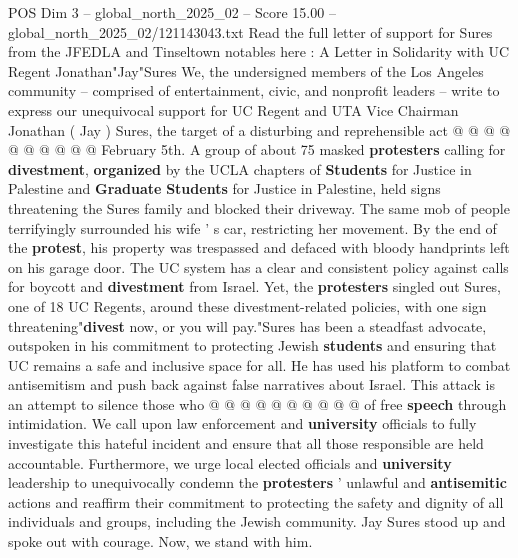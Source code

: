 \begin{textsample}{POS Dim 3 – global\_north\_2025\_02 – Score 15.00 – global\_north\_2025\_02/121143043.txt}
Read the full letter of support for Sures from the JFEDLA and Tinseltown notables here : A Letter in Solidarity with UC Regent Jonathan"Jay"Sures We, the undersigned members of the Los Angeles community -- comprised of entertainment, civic, and nonprofit leaders -- write to express our unequivocal support for UC Regent and UTA Vice Chairman Jonathan ( Jay ) Sures, the target of a disturbing and reprehensible act @ @ @ @ @ @ @ @ @ @ February 5th.
A group of about 75 masked \textbf{protesters} calling for \textbf{divestment}, \textbf{organized} by the UCLA chapters of \textbf{Students} for Justice in Palestine and \textbf{Graduate} \textbf{Students} for Justice in Palestine, held signs threatening the Sures family and blocked their driveway.
The same mob of people terrifyingly surrounded his wife ' s car, restricting her movement.
By the end of the \textbf{protest}, his property was trespassed and defaced with bloody handprints left on his garage door.
The UC system has a clear and consistent policy against calls for boycott and \textbf{divestment} from Israel.
Yet, the \textbf{protesters} singled out Sures, one of 18 UC Regents, around these divestment-related policies, with one sign threatening"\textbf{divest} now, or you will pay."Sures has been a steadfast advocate, outspoken in his commitment to protecting Jewish \textbf{students} and ensuring that UC remains a safe and inclusive space for all.
He has used his platform to combat antisemitism and push back against false narratives about Israel.
This attack is an attempt to silence those who @ @ @ @ @ @ @ @ @ @ of free \textbf{speech} through intimidation.
We call upon law enforcement and \textbf{university} officials to fully investigate this hateful incident and ensure that all those responsible are held accountable.
Furthermore, we urge local elected officials and \textbf{university} leadership to unequivocally condemn the \textbf{protesters} ' unlawful and \textbf{antisemitic} actions and reaffirm their commitment to protecting the safety and dignity of all individuals and groups, including the Jewish community.
Jay Sures stood up and spoke out with courage.
Now, we stand with him.

\end{textsample}
